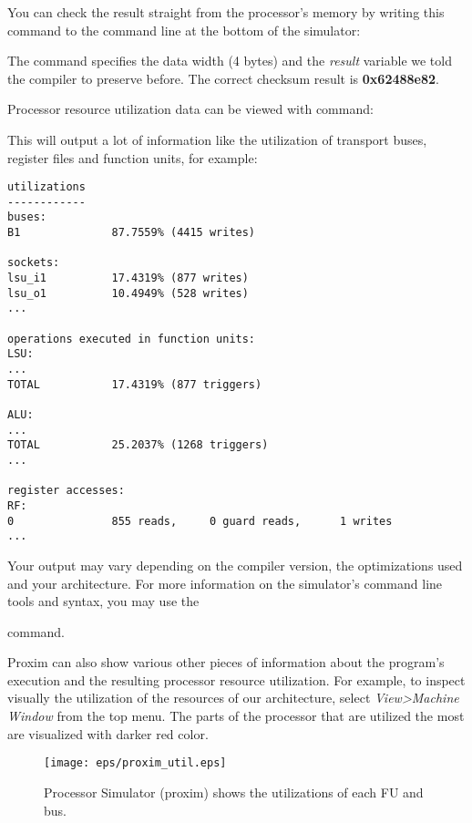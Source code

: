 \documentclass[twoside]{tceusermanual}
\begin{document}
You can check the result straight from the processor's memory by writing this
command to the command line at the bottom of the simulator:


The command specifies the data width (4 bytes) and the \textit{result} variable we told the compiler to preserve before. The correct checksum result is
\textbf{0x62488e82}.

Processor resource utilization data can be viewed with command:


This will output a lot of information like the utilization of transport buses,
register files and function units, for example: 

\begin{verbatim}
utilizations
------------
buses:
B1              87.7559% (4415 writes)

sockets:
lsu_i1          17.4319% (877 writes)
lsu_o1          10.4949% (528 writes)
...

operations executed in function units:
LSU:
...
TOTAL           17.4319% (877 triggers)

ALU:
...
TOTAL           25.2037% (1268 triggers)
...

register accesses:
RF:
0               855 reads,     0 guard reads,      1 writes       
...

\end{verbatim}

Your output may vary depending on the compiler version, the optimizations
used and your architecture. For more information on the simulator's command 
line tools and syntax, you may use the 


command.

Proxim can also show various other pieces of information about the
program's execution and the resulting processor resource utilization. For
example, to inspect visually the utilization of the resources of our
architecture, select \textit{View>Machine Window} from the top menu.
The parts of the processor that are utilized the most are visualized with darker
red color.

\begin{figure}
  \begin{center}
    \texttt{[image: eps/proxim\_util.eps]}
    \caption{Processor Simulator (proxim) shows the utilizations of each FU and bus.}
    \label{fig:proxim_util}
  \end{center}
\end{figure}
\end{document}
